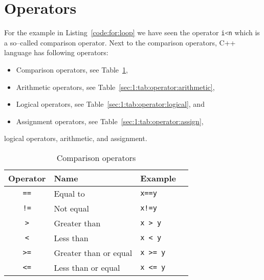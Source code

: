 


\section{Operators}
For the example in Listing~\ref{code:for:loop} we have seen the operator \lstinline[language=C++]|i<n| which is a so--called comparison operator. Next to the comparison operators, C++ language has following operators:
\begin{itemize}
\item Comparison operators, see Table~\ref{sec:1:tab:operator:comp},
\item Arithmetic operators, see Table~\ref{sec:1:tab:operator:arithmetic},
\item Logical operators, see Table~\ref{sec:1:tab:operator:logical}, and
\item Assignment operators, see Table~\ref{sec:1:tab:operator:assign},
\end{itemize}
 logical operators, arithmetic, and assignment.

\begin{table}[p]
\centering
\begin{tabular}{clll}
\toprule
Operator & Name  & Example \\ 
\midrule
\lstinline|==| & Equal to & \lstinline|x==y|\\ 
\lstinline|!=| & Not equal & \lstinline|x!=y|\\ 
\lstinline|>| & Greater than & \lstinline|x > y|\\ 
\lstinline|<| & Less than & \lstinline|x < y|\\ 
\lstinline|>=| & Greater than or equal & \lstinline|x >= y|\\ 
\lstinline|<=| & Less than or equal & \lstinline|x <= y|\\ 
\bottomrule 
\end{tabular} 
\caption{Comparison operators}
\label{sec:1:tab:operator:comp}
\end{table}

